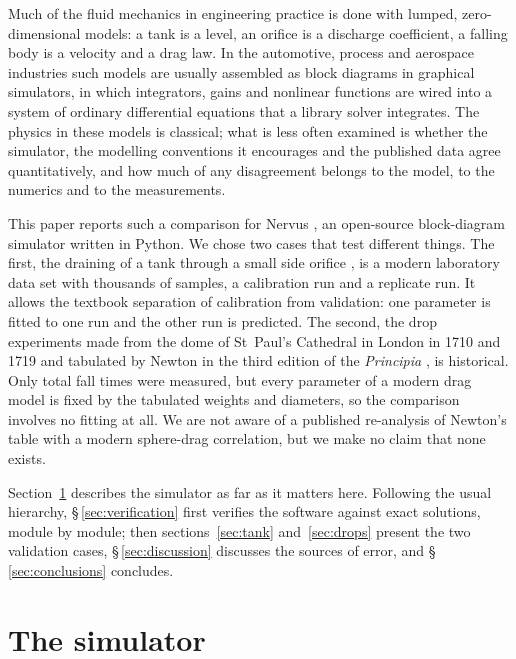 \documentclass{jfm}
\begin{document}
Much of the fluid mechanics in engineering practice is done with lumped, zero-dimensional models: a tank is a
level, an orifice is a discharge coefficient, a falling body is a velocity and a drag law. In the automotive,
process and aerospace industries such models are usually assembled as block diagrams in graphical simulators, in
which integrators, gains and nonlinear functions are wired into a system of ordinary differential equations that
a library solver integrates. The physics in these models is classical; what is less often examined is whether the
simulator, the modelling conventions it encourages and the published data agree quantitatively, and how much of
any disagreement belongs to the model, to the numerics and to the measurements.

This paper reports such a comparison for Nervus \citep{Nervus}, an open-source block-diagram simulator written in
Python. We chose two cases that test different things. The first, the draining of a tank through a small side
orifice \citep{Fabusola2025}, is a modern laboratory data set with thousands of samples, a calibration run and a
replicate run. It allows the textbook separation of calibration from validation: one parameter is fitted to one
run and the other run is predicted. The second, the drop experiments made from the dome of St~Paul's Cathedral in
London in 1710 and 1719 and tabulated by Newton in the third edition of the \emph{Principia}
\citep{Newton1726,Newton1846}, is historical. Only total fall times were measured, but every parameter of a
modern drag model is fixed by the tabulated weights and diameters, so the comparison involves no fitting at all.
We are not aware of a published re-analysis of Newton's table with a modern sphere-drag correlation, but we make
no claim that none exists.

Section~\ref{sec:nervus} describes the simulator as far as it matters here. Following the usual hierarchy,
\S\,\ref{sec:verification} first verifies the software against exact solutions, module by module; then
sections~\ref{sec:tank} and~\ref{sec:drops} present the two validation cases, \S\,\ref{sec:discussion} discusses the sources of error, and
\S\,\ref{sec:conclusions} concludes.

\section{The simulator}\label{sec:nervus}
\end{document}
